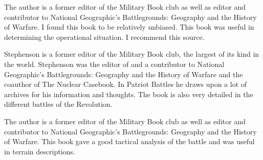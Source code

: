 The author is a former editor of the Military Book club as well
as editor and contributor to National Geographic’s Battlegrounds: Geography and
the History of Warfare. I found this book to be relatively unbiased.  This book
was useful in determining the operational situation.  I recommend this source.

Stephenson is a former editor of the Military Book club, the largest of its
kind in the world. Stephenson was the editor of and a contributor to National
Geographic's Battlegrounds: Geography and the History of Warfare and the
coauthor of The Nuclear Casebook. In Patriot Battles he draws upon a lot of
archives for his information and thoughts. The book is also very detailed in
the different battles of the Revolution.

The author is a former editor of the Military Book club as well as editor and
contributor to National Geographic’s Battlegrounds: Geography and the History
of Warfare.  This book gave a good tactical analysis of the battle and was
useful in terrain descriptions.
